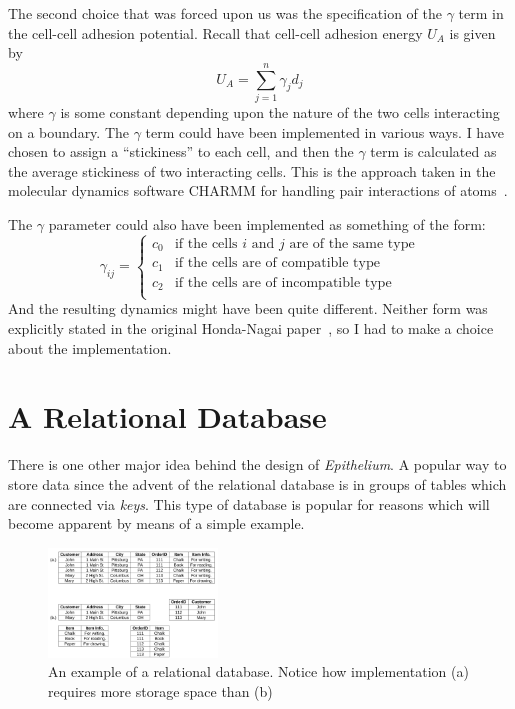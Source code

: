 The second choice that was forced upon us was the specification of the $\gamma$ term in the cell-cell adhesion potential. Recall that cell-cell adhesion energy $U_A$ is given by
\begin{equation}U_A = \displaystyle\sum\limits_{j = 1}^{n}\gamma_{j}d_{j}\end{equation}
where  $\gamma$ is some constant depending upon the nature of the two cells interacting on a boundary. The $\gamma$ term could have been implemented in various ways. I have chosen to assign a ``stickiness'' to each cell, and then the $\gamma$ term is calculated as the average stickiness of two interacting cells. This is the approach taken in the molecular dynamics software CHARMM for handling pair interactions of atoms~\cite{CHARMM}.

The $\gamma$ parameter could also have been implemented as something of the form:
\[  \gamma_{ij} =  \left\{
\begin{array}{ll}
      c_0 & \textrm{if the cells $i$ and $j$ are of the same type} \\
      c_1 &  \textrm{if the cells are of compatible type}\\
      c_2 & \textrm{if the cells are of incompatible type} \\
\end{array} 
\right. \]
And the resulting dynamics might have been quite different. Neither form was explicitly stated in the original Honda-Nagai paper~\cite{HondaNagai}, so I had to make a choice about the implementation.

\section{A Relational Database}
There is one other major idea behind the design of \emph{Epithelium}. A 
popular way to store data since the advent of the relational database is in groups of tables which are connected via \emph{keys}. This type of database is popular for reasons which will become apparent by means of a simple example. 

\begin{figure}
\centering
\includegraphics[width=0.4\textwidth]{../diagrams/relationaldb.png}
\caption[An example of a relational database.]{An example of a relational database. Notice how implementation (a) requires more storage space than (b)}
\end{figure}

